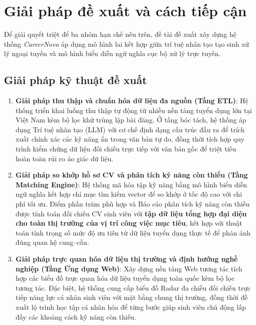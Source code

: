 \section{Giải pháp đề xuất và cách tiếp cận}

Để giải quyết triệt để ba nhóm hạn chế nêu trên, đề tài đề xuất xây dựng hệ thống \textit{CareerNova} áp dụng mô hình lai kết hợp giữa trí tuệ nhân tạo tạo sinh xử lý ngoại tuyến và mô hình biểu diễn ngữ nghĩa cục bộ xử lý trực tuyến.

\subsection{Giải pháp kỹ thuật đề xuất}

\begin{enumerate}
    \item \textbf{Giải pháp thu thập và chuẩn hóa dữ liệu đa nguồn (Tầng ETL)}:
    Hệ thống triển khai luồng thu thập tự động từ nhiều nền tảng tuyển dụng lớn tại Việt Nam kèm bộ lọc khử trùng lặp bài đăng. Ở tầng bóc tách, hệ thống áp dụng Trí tuệ nhân tạo (LLM) với cơ chế định dạng cấu trúc đầu ra để trích xuất chính xác các kỹ năng ẩn trong văn bản tự do, đồng thời tích hợp quy trình kiểm chứng dữ liệu đối chiếu trực tiếp với văn bản gốc để triệt tiêu hoàn toàn rủi ro ảo giác dữ liệu.

    \item \textbf{Giải pháp so khớp hồ sơ CV và phân tích kỹ năng còn thiếu (Tầng Matching Engine)}:
    Hệ thống mã hóa tập kỹ năng bằng mô hình biểu diễn ngữ nghĩa kết hợp chỉ mục tìm kiếm vector để so khớp ở tốc độ cao với chi phí tối ưu. Điểm phần trăm phù hợp và Báo cáo phân tích kỹ năng còn thiếu được tính toán đối chiếu CV sinh viên với \textbf{tập dữ liệu tổng hợp đại diện cho toàn thị trường của vị trí công việc mục tiêu}, kết hợp với thuật toán tính trọng số mức độ ưu tiên từ dữ liệu tuyển dụng thực tế để phản ánh đúng quan hệ cung--cầu.

    \item \textbf{Giải pháp trực quan hóa dữ liệu thị trường và định hướng nghề nghiệp (Tầng Ứng dụng Web)}:
    Xây dựng nền tảng Web tương tác tích hợp các biểu đồ trực quan hóa dữ liệu tuyển dụng toàn quốc kèm bộ lọc tương tác. Đặc biệt, hệ thống cung cấp biểu đồ Radar đa chiều đối chiếu trực tiếp năng lực cá nhân sinh viên với mặt bằng chung thị trường, đồng thời đề xuất lộ trình học tập cá nhân hóa để từng bước giúp sinh viên chủ động lấp đầy các khoảng cách kỹ năng còn thiếu.
\end{enumerate}

